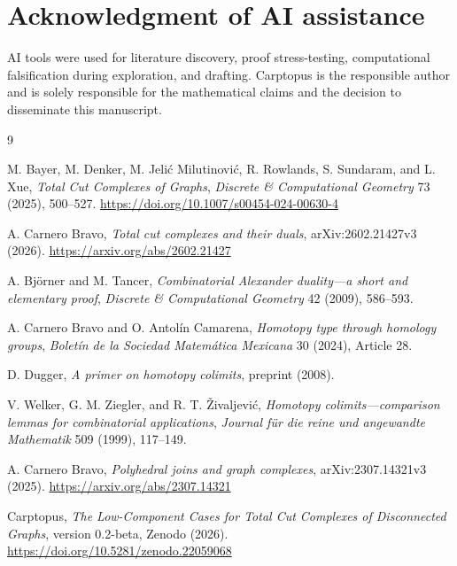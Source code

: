 \documentclass[11pt]{article}
\theoremstyle{remark}
\numberwithin{equation}{section}
\begin{document}
\section*{Acknowledgment of AI assistance}

AI tools were used for literature discovery, proof stress-testing,
computational falsification during exploration, and drafting. Carptopus is the
responsible author and is solely responsible for the mathematical claims and
the decision to disseminate this manuscript.

\begingroup
\small
\raggedright
\setlength{\parskip}{0.25em}
\begin{thebibliography}{9}

M. Bayer, M. Denker, M. Jeli\'c Milutinovi\'c, R. Rowlands, S. Sundaram, and
L. Xue,
\emph{Total Cut Complexes of Graphs}, \emph{Discrete \& Computational Geometry}
73 (2025), 500--527.
\url{https://doi.org/10.1007/s00454-024-00630-4}

A. Carnero Bravo,
\emph{Total cut complexes and their duals}, arXiv:2602.21427v3 (2026).
\url{https://arxiv.org/abs/2602.21427}

A. Bj\"orner and M. Tancer,
\emph{Combinatorial Alexander duality---a short and elementary proof},
\emph{Discrete \& Computational Geometry} 42 (2009), 586--593.

A. Carnero Bravo and O. Antol\'in Camarena,
\emph{Homotopy type through homology groups},
\emph{Bolet\'in de la Sociedad Matem\'atica Mexicana} 30 (2024), Article 28.

D. Dugger,
\emph{A primer on homotopy colimits}, preprint (2008).

V. Welker, G. M. Ziegler, and R. T. \v{Z}ivaljevi\'c,
\emph{Homotopy colimits---comparison lemmas for combinatorial applications},
\emph{Journal f\"ur die reine und angewandte Mathematik} 509 (1999), 117--149.

A. Carnero Bravo,
\emph{Polyhedral joins and graph complexes}, arXiv:2307.14321v3 (2025).
\url{https://arxiv.org/abs/2307.14321}

Carptopus,
\emph{The Low-Component Cases for Total Cut Complexes of Disconnected Graphs},
version 0.2-beta, Zenodo (2026).
\url{https://doi.org/10.5281/zenodo.22059068}

\end{thebibliography}
\endgroup
\end{document}
